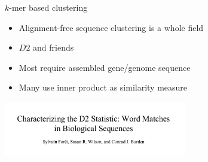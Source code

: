 \documentclass[t]{beamer}
\begin{document}
\begin{frame}{$k$-mer based clustering}
  \begin{itemize}
    \item Alignment-free sequence clustering is a whole field
    \item $D2$ and friends
    \item Most require assembled gene/genome sequence
    \item Many use inner product as similarity measure
  \end{itemize}
  \begin{center}
    \includegraphics[width=0.6\textwidth]{img/foret-et-al-d2.png}
  \end{center}
\end{frame}
\end{document}
